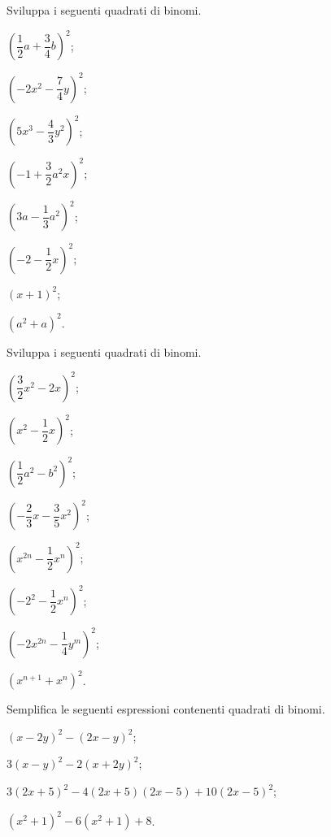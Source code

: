 \begin{esercizio}
 \label{ese:11.6}
Sviluppa i seguenti quadrati di binomi.
\begin{multicols}{4}
\begin{enumeratea}
 \item $\left(\dfrac{1}{2}a+\dfrac{3}{4}b\right)^{2}$;
 \item $\left(-2x^{2}-\dfrac{7}{4}y\right)^{2}$;
 \item $\left(5x^{3}-\dfrac{4}{3}y^{2}\right)^{2}$;
 \item $\left(-1+\dfrac{3}{2}a^{2}x\right)^{2}$;
 \item $\left(3a-\dfrac{1}{3}a^{2}\right)^{2}$;
 \item $\left(-2-\dfrac{1}{2}x\right)^{2}$;
 \item $\left(x+1\right)^{2}$;
 \item $\left(a^{2}+a\right)^{2}$.
\end{enumeratea}
\end{multicols}
\end{esercizio}

\begin{esercizio}
 \label{ese:11.7}
Sviluppa i seguenti quadrati di binomi.
\begin{multicols}{2}
\begin{enumeratea}
 \item $\left(\dfrac{3}{2}x^{2}-2x\right)^{2}$;
 \item $\left(x^{2}-\dfrac{1}{2}x\right)^{2}$;
 \item $\left(\dfrac{1}{2}a^{2}-b^{2}\right)^{2}$;
 \item $\left(-{\dfrac{2}{3}x-\dfrac{3}{5}x^{2}}\right)^{2}$;
 \item $\left(x^{2n}-\dfrac{1}{2}x^{n}\right)^{2}$;
 \item $\left(-2^{2}-\dfrac{1}{2}x^{n}\right)^{2}$;
 \item $\left(-2x^{2n}-\dfrac{1}{4}y^{m}\right)^{2}$;
 \item $\left(x^{n+1}+x^{n}\right)^{2}$.
\end{enumeratea}
\end{multicols}
\end{esercizio}

\begin{esercizio}[\Ast]
 \label{ese:11.8}
Semplifica le seguenti espressioni contenenti quadrati di binomi.

\begin{enumeratea}
 \item $\left(x-2y\right)^{2}-\left(2x-y\right)^{2}$;
 \item $3(x-y)^{2}-2(x+2y)^{2}$;
 \item $3(2x+5)^{2}-4(2x+5)(2x-5)+10(2x-5)^{2}$;
 \item $\left(x^{2}+1\right)^{2}-6\left(x^{2}+1\right)+8$.
\end{enumeratea}
\end{esercizio}


